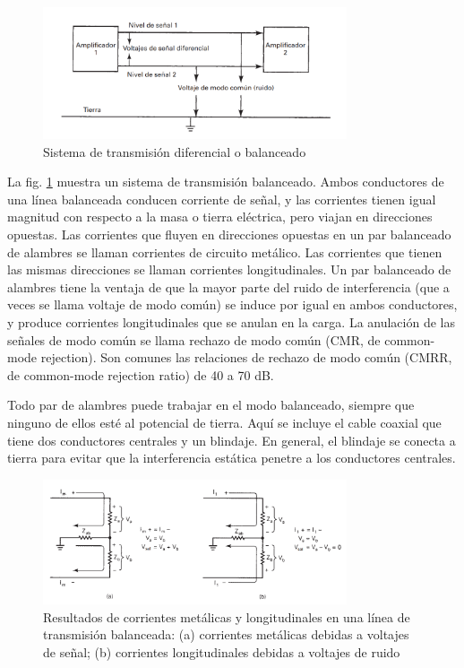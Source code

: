             \begin{figure}[H]
                \centering
                \includegraphics[width=0.8\textwidth]{imagenes/balanceadas.png}
                \caption{Sistema de transmisión diferencial o balanceado}
                \label{fig:balanceadas}
            \end{figure}

            La fig. \ref{fig:balanceadas} muestra un sistema de transmisión balanceado. Ambos conductores de una línea balanceada conducen corriente de señal, y las corrientes tienen igual magnitud con respecto a la masa o tierra eléctrica, pero viajan en direcciones opuestas. Las corrientes que fluyen en direcciones opuestas en un par balanceado de alambres se llaman corrientes de circuito metálico. Las corrientes que tienen las mismas direcciones se llaman corrientes longitudinales. Un par balanceado de alambres tiene la ventaja de que la mayor parte del ruido de interferencia (que a veces se llama voltaje de modo común) se induce por igual en ambos conductores, y produce corrientes longitudinales que se anulan en la carga. La anulación de las señales de modo común se llama rechazo de modo común (CMR, de common-mode rejection). Son comunes las relaciones de rechazo de modo común (CMRR, de common-mode rejection ratio) de 40 a 70 dB.

            Todo par de alambres puede trabajar en el modo balanceado, siempre que ninguno de ellos esté al potencial de tierra. Aquí se incluye el cable coaxial que tiene dos conductores centrales y un blindaje. En general, el blindaje se conecta a tierra para evitar que la interferencia estática penetre a los conductores centrales.

            \begin{figure}[H]
                \centering
                \includegraphics[width=0.8\textwidth]{imagenes/corriente_cmrr.png}
                \caption{Resultados de corrientes metálicas y longitudinales en una línea de transmisión balanceada: (a) corrientes metálicas debidas a voltajes de señal; (b) corrientes longitudinales debidas a voltajes de ruido}
                \label{fig:corriente_cmrr}
            \end{figure}

